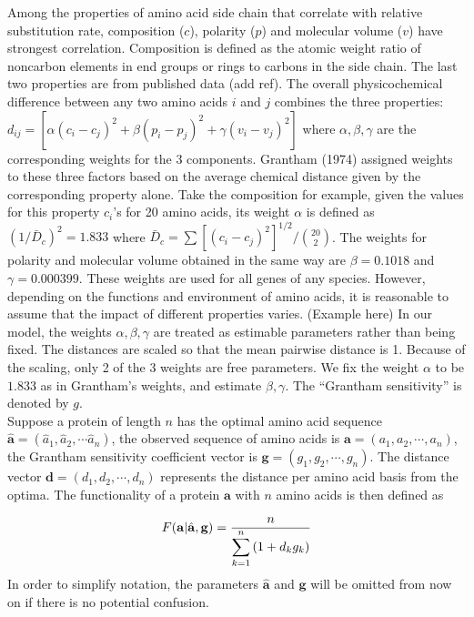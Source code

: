 \documentclass[13pt]{article}
\begin{document}
Among the properties of amino acid side chain that correlate with relative substitution rate, composition ($c$), polarity ($p$) and molecular volume ($v$) have strongest correlation.
Composition is defined as the atomic weight ratio of noncarbon elements in end groups or rings to carbons in the side chain.
The last two properties are from published data (add ref).
The overall physicochemical difference between any two amino acids $i$ and $j$ combines the three properties: $d_{ij} = [\alpha (c_i-c_j)^2 + \beta (p_i - p_j)^2 + \gamma (v_i - v_j)^2]$ where $\alpha, \beta, \gamma$ are the corresponding weights for the 3 components.
Grantham (1974) assigned weights to these three factors based on the average chemical distance given by the corresponding property alone.
Take the composition for example, given the values for this property $c_i$'s for 20 amino acids, its weight $\alpha$ is defined as $(1/\bar{D}_c)^2 = 1.833$ where $\bar{D}_c = \sum[(c_i - c_j)^2]^{1/2}/\binom{20}{2}$.
The weights for polarity and molecular volume obtained in the same way are $\beta = 0.1018$ and $\gamma = 0.000399$.
These weights are used for all genes of any species.
However, depending on the functions and environment of amino acids, it is reasonable to assume that the impact of different properties varies. (Example here) In our model, the weights $\alpha, \beta, \gamma$ are treated as estimable parameters rather than being fixed.
The distances are scaled so that the mean pairwise distance is 1.
Because of the scaling, only 2 of the 3 weights are free parameters.
We fix the weight $\alpha$ to be $1.833$ as in Grantham's weights, and estimate $\beta, \gamma$.
The ``Grantham sensitivity'' is denoted by $g$.\\

Suppose a protein of length $n$ has the optimal amino acid sequence $\hat{\mathbf{a}} = (\hat{a}_1, \hat{a}_2, \cdots \hat{a}_n)$, the observed sequence of amino acids is $\mathbf{a} = (a_1, a_2, \cdots, a_n)$, the Grantham sensitivity coefficient vector is  $\mathbf{g}=(g_1,g_2,\cdots,g_n)$.
The distance vector $\mathbf{d} = (d_1, d_2, \cdots, d_n)$ represents the distance per amino acid basis from the optima.
The functionality of a protein $\mathbf{a}$ with $n$ amino acids is then defined as

\begin{equation}
F(\mathbf{a}| \hat{\mathbf{a}},\mathbf{g})  =  \frac{n}{\displaystyle  \sum_{k=1}^n{(1+d_kg_k)}} \label{eq:harmonic}\\
\end{equation}
In order to simplify notation, the parameters $\hat{\mathbf{a}}$ and $\mathbf{g}$ will be omitted from now on if there is no potential confusion.\\
\end{document}
